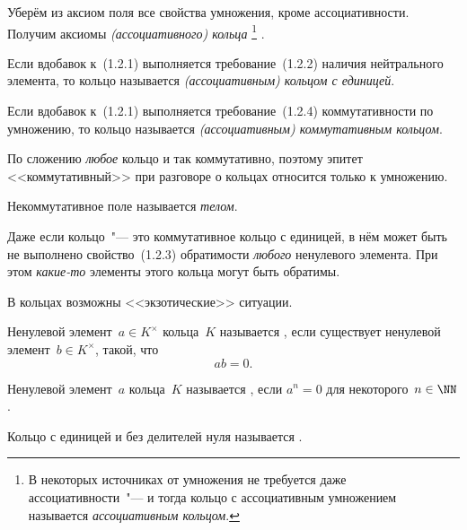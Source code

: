 \begin{definition}
	Уберём из аксиом поля все свойства умножения, кроме ассоциативности. Получим аксиомы \emph{(ассоциативного) кольца}%
\footnote{%
	В некоторых источниках от умножения не требуется даже ассоциативности~"--- и тогда кольцо с ассоциативным умножением называется \emph{ассоциативным кольцом}.%
}%
.
\end{definition}

\begin{definition}
	Если вдобавок к~(1.2.1) выполняется требование~(1.2.2) наличия нейтрального элемента, то кольцо называется \emph{(ассоциативным) кольцом с единицей}.
\end{definition}

\begin{definition}
	Если вдобавок к~(1.2.1) выполняется требование~(1.2.4) коммутативности по умножению, то кольцо называется \emph{(ассоциативным) коммутативным кольцом}.
\end{definition}

\begin{remark}
	По сложению \emph{любое} кольцо и так коммутативно, поэтому эпитет <<коммутативный>> при разговоре о кольцах относится только к умножению.
\end{remark}


\begin{definition}
	Некоммутативное поле называется \emph{телом}.
\end{definition}

\begin{remark}
	Даже если кольцо~"--- это коммутативное кольцо с единицей, в нём может быть не выполнено свойство~(1.2.3) обратимости \emph{любого} ненулевого элемента. При этом \emph{какие-то} элементы этого кольца могут быть обратимы.
\end{remark}

В кольцах возможны <<экзотические>> ситуации.
\begin{definition}
	Ненулевой элемент~$a \in K^\times$ кольца~$K$ называется , если существует ненулевой элемент~$b \in K^\times$, такой, что
	\[
		ab = 0
		.
	\]
\end{definition}

\begin{definition}
	Ненулевой элемент~$a$ кольца~$K$ называется , если $a^n = 0$ для некоторого~$n \in \NN$.
\end{definition}

\begin{definition}
	Кольцо с единицей и без делителей нуля называется .
\end{definition}

